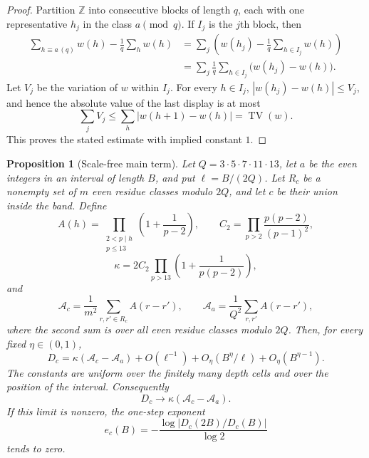 \documentclass[11pt,a4paper]{article}
\theoremstyle{plain}
\newtheorem{proposition}[theorem]{Proposition}
\theoremstyle{definition}
\theoremstyle{remark}
\begin{document}
\begin{proof}
Partition $\mathbb Z$ into consecutive blocks of length $q$, each with
one representative $h_j$ in the class $a\pmod q$.  If $I_j$ is the
$j$th block, then
\[
\begin{aligned}
 \sum_{h\equiv a\,(q)}w(h)-\frac1q\sum_hw(h)
 &=\sum_j\left(w(h_j)-\frac1q\sum_{h\in I_j}w(h)\right)\\
 &=\sum_j\frac1q\sum_{h\in I_j}\bigl(w(h_j)-w(h)\bigr).
\end{aligned}
\]
Let $V_j$ be the variation of $w$ within $I_j$.  For every
$h\in I_j$, $|w(h_j)-w(h)|\leq V_j$, and hence the absolute value of
the last display is at most
\[
 \sum_jV_j\leq\sum_h|w(h+1)-w(h)|=\operatorname{TV}(w).
\]
This proves the stated estimate with implied constant $1$.
\end{proof}

\begin{proposition}[Scale-free main term]\label{prop:scaleinv}
Let
$Q=3\cdot5\cdot7\cdot11\cdot13$, let $a$ be the even integers in an
interval of length $B$, and put $\ell=B/(2Q)$.  Let $R_c$ be a nonempty
set of $m$ even residue classes modulo $2Q$, and let $c$ be their union
inside the band.  Define
\[
 A(h)=\prod_{\substack{2<p\mid h\\p\leq13}}
       \left(1+\frac1{p-2}\right),
 \qquad
 C_2=\prod_{p>2}\frac{p(p-2)}{(p-1)^2},
\]
\[
 \kappa=2C_2\prod_{p>13}\left(1+\frac1{p(p-2)}\right),
\]
and
\[
 \mathcal A_c=\frac1{m^2}\sum_{r,r'\in R_c}A(r-r'),
 \qquad
 \mathcal A_a=\frac1{Q^2}\sum_{r,r'}A(r-r'),
\]
where the second sum is over all even residue classes modulo $2Q$.
Then, for every fixed $\eta\in(0,1)$,
\begin{equation}\label{eq:scaleinv}
 D_c=\kappa(\mathcal A_c-\mathcal A_a)
 +O(\ell^{-1})+O_\eta(B^\eta/\ell)+O_\eta(B^{\eta-1}).
\end{equation}
The constants are uniform over the finitely many depth cells and over
the position of the interval.  Consequently
\[
 D_c\longrightarrow\kappa(\mathcal A_c-\mathcal A_a).
\]
If this limit is nonzero, the one-step exponent
\[
 e_c(B)=-\frac{\log|D_c(2B)/D_c(B)|}{\log2}
\]
tends to zero.
\end{proposition}
\end{document}
